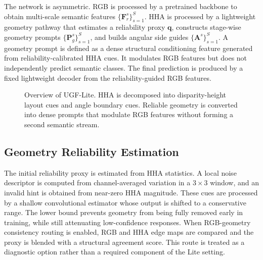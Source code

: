 \documentclass[a4paper,fleqn]{cas-dc}
\begin{document}
The network is asymmetric. RGB is processed by a pretrained backbone to obtain multi-scale semantic features $\{\mathbf{F}_{r}^{s}\}_{s=1}^{S}$. HHA is processed by a lightweight geometry pathway that estimates a reliability proxy $\mathbf{q}$, constructs stage-wise geometry prompts $\{\mathbf{P}_{g}^{s}\}_{s=1}^{S}$, and builds angular side guides $\{\mathbf{A}^{s}\}_{s=1}^{S}$. A geometry prompt is defined as a dense structural conditioning feature generated from reliability-calibrated HHA cues. It modulates RGB features but does not independently predict semantic classes. The final prediction is produced by a fixed lightweight decoder from the reliability-guided RGB features.

\begin{figure}%
  \centering
    \caption{Overview of UGF-Lite. HHA is decomposed into disparity-height layout cues and angle boundary cues. Reliable geometry is converted into dense prompts that modulate RGB features without forming a second semantic stream.}\label{fig:overview}
\end{figure}

\subsection{Geometry Reliability Estimation}

The initial reliability proxy is estimated from HHA statistics. A local noise descriptor is computed from channel-averaged variation in a $3\times3$ window, and an invalid hint is obtained from near-zero HHA magnitude. These cues are processed by a shallow convolutional estimator whose output is shifted to a conservative range. The lower bound prevents geometry from being fully removed early in training, while still attenuating low-confidence responses. When RGB-geometry consistency routing is enabled, RGB and HHA edge maps are compared and the proxy is blended with a structural agreement score. This route is treated as a diagnostic option rather than a required component of the Lite setting.
\end{document}
